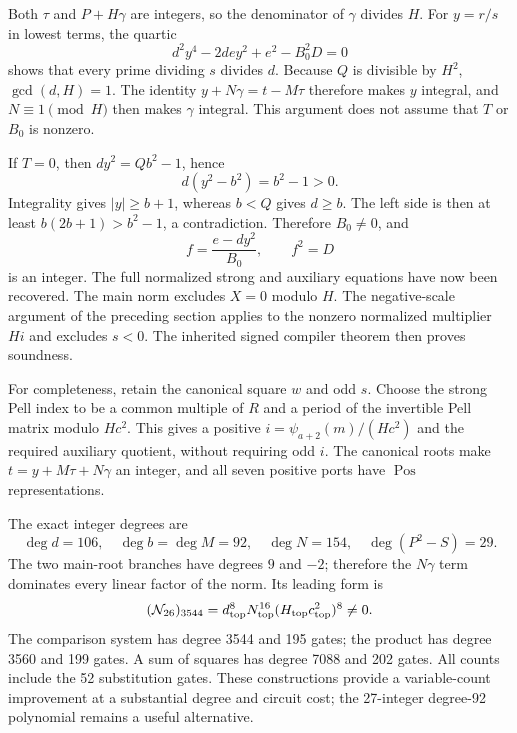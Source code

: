Both $\tau$ and $P+H\gamma$ are integers, so the denominator of
$\gamma$ divides $H$. For $y=r/s$ in lowest terms, the quartic
\[
 d^2y^4-2dey^2+e^2-B_0^2D=0
\]
shows that every prime dividing $s$ divides $d$. Because $Q$ is
divisible by $H^2$, $\gcd(d,H)=1$. The identity
$y+N\gamma=t-M\tau$ therefore makes $y$ integral, and
$N\equiv1\pmod H$ then makes $\gamma$ integral. This argument
does not assume that $T$ or $B_0$ is nonzero.

If $T=0$, then $dy^2=Qb^2-1$, hence
\[
 d(y^2-b^2)=b^2-1>0.
\]
Integrality gives $|y|\ge b+1$, whereas $b<Q$ gives $d\ge b$.
The left side is then at least $b(2b+1)>b^2-1$, a contradiction.
Therefore $B_0\ne0$, and
\[
 f=\frac{e-dy^2}{B_0},\qquad f^2=D
\]
is an integer. The full normalized strong and auxiliary equations have
now been recovered. The main norm excludes $X=0$ modulo $H$. The
negative-scale argument of the preceding section applies to the nonzero
normalized multiplier $Hi$ and excludes $s<0$. The inherited signed
compiler theorem then proves soundness.

For completeness, retain the canonical square $w$ and odd $s$. Choose
the strong Pell index to be a common multiple of $R$ and a period of
the invertible Pell matrix modulo $Hc^2$. This gives a positive
$i=\psi_{a+2}(m)/(Hc^2)$ and the required auxiliary quotient, without
requiring odd $i$. The canonical roots make
$t=y+M\tau+N\gamma$ an integer, and all seven positive ports have
$\operatorname{Pos}$ representations.

The exact integer degrees are
\[
 \deg d=106,\quad \deg b=\deg M=92,\quad\deg N=154,
 \quad \deg(P^2-S)=29.
\]
The two main-root branches have degrees $9$ and $-2$; therefore the
$N\gamma$ term dominates every linear factor of the norm. Its leading
form is
\[
 (\mathcal N_{26})_{3544}
 =d_{\rm top}^{8}N_{\rm top}^{16}
   (H_{\rm top}c_{\rm top}^{2})^8\ne0.
\]
The comparison system has degree 3544 and 195 gates; the product has
degree 3560 and 199 gates. A sum of squares has degree 7088 and 202
gates. All counts include the 52 substitution gates. These constructions
provide a variable-count improvement at a substantial degree and circuit
cost; the 27-integer degree-92 polynomial remains a useful alternative.
